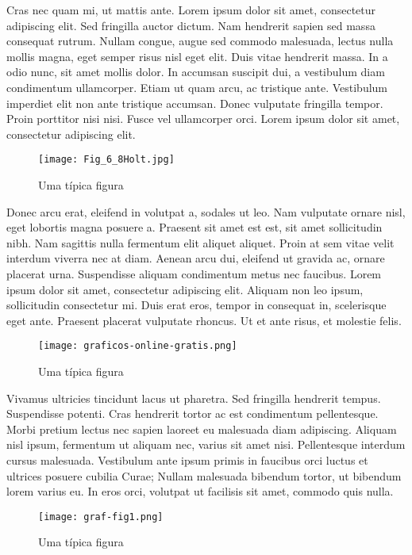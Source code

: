 Cras nec quam mi, ut mattis ante. Lorem ipsum dolor sit amet, consectetur adipiscing elit. Sed fringilla auctor dictum. Nam hendrerit sapien sed massa consequat rutrum. Nullam congue, augue sed commodo malesuada, lectus nulla mollis magna, eget semper risus nisl eget elit. Duis vitae hendrerit massa. In a odio nunc, sit amet mollis dolor. In accumsan suscipit dui, a vestibulum diam condimentum ullamcorper. Etiam ut quam arcu, ac tristique ante. Vestibulum imperdiet elit non ante tristique accumsan. Donec vulputate fringilla tempor. Proin porttitor nisi nisi. Fusce vel ullamcorper orci. Lorem ipsum dolor sit amet, consectetur adipiscing elit. 


\begin{figure}[!htp]
\centering
\texttt{[image: Fig\_6\_8Holt.jpg]}
\caption{Uma típica figura}
\end{figure}


Donec arcu erat, eleifend in volutpat a, sodales ut leo. Nam vulputate ornare nisl, eget lobortis magna posuere a. Praesent sit amet est est, sit amet sollicitudin nibh. Nam sagittis nulla fermentum elit aliquet aliquet. Proin at sem vitae velit interdum viverra nec at diam. Aenean arcu dui, eleifend ut gravida ac, ornare placerat urna. Suspendisse aliquam condimentum metus nec faucibus. Lorem ipsum dolor sit amet, consectetur adipiscing elit. Aliquam non leo ipsum, sollicitudin consectetur mi. Duis erat eros, tempor in consequat in, scelerisque eget ante. Praesent placerat vulputate rhoncus. Ut et ante risus, et molestie felis.


\begin{figure}[!htp]
\centering
\texttt{[image: graficos-online-gratis.png]}
\caption{Uma típica figura}
\end{figure}


Vivamus ultricies tincidunt lacus ut pharetra. Sed fringilla hendrerit tempus. Suspendisse potenti. Cras hendrerit tortor ac est condimentum pellentesque. Morbi pretium lectus nec sapien laoreet eu malesuada diam adipiscing. Aliquam nisl ipsum, fermentum ut aliquam nec, varius sit amet nisi. Pellentesque interdum cursus malesuada. Vestibulum ante ipsum primis in faucibus orci luctus et ultrices posuere cubilia Curae; Nullam malesuada bibendum tortor, ut bibendum lorem varius eu. In eros orci, volutpat ut facilisis sit amet, commodo quis nulla.


\begin{figure}[!htp]
\centering
\texttt{[image: graf-fig1.png]}
\caption{Uma típica figura}
\end{figure}



